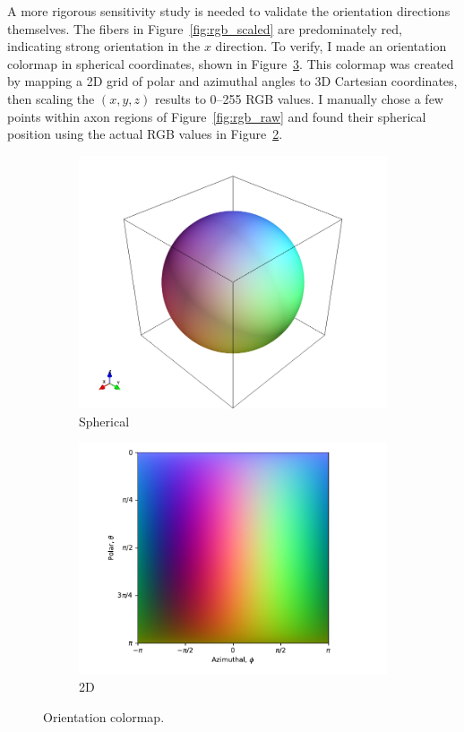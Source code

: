\documentclass[11pt]{article}
\begin{document}
A more rigorous sensitivity study is needed to validate the orientation
directions themselves. The fibers in Figure~\ref{fig:rgb_scaled} are
predominately red, indicating strong orientation in the $x$ direction.  To
verify, I made an orientation colormap in spherical coordinates, shown in
Figure~\ref{fig:cmap}. This colormap was created by mapping a 2D grid of polar
and azimuthal angles to 3D Cartesian coordinates, then scaling the $(x, y, z)$
results to 0--255 RGB values. I manually chose a few points within axon regions
of Figure~\ref{fig:rgb_raw} and found their spherical position using the actual
RGB values in Figure~\ref{fig:2Dcmap}.
\begin{figure}[h]
  \centering
  \begin{subfigure}[b]{0.48\textwidth}
    \centering \includegraphics[width=\textwidth]{../figs/colormap_sphere}
    \caption{Spherical\label{fig:3Dcmap}}
  \end{subfigure}
  \begin{subfigure}[b]{0.48\textwidth}
    \centering \includegraphics[width=\textwidth]{../figs/colormap}
    \caption{2D \label{fig:2Dcmap}}
  \end{subfigure}
  \caption{Orientation colormap. \label{fig:cmap}}
\end{figure}
\end{document}
